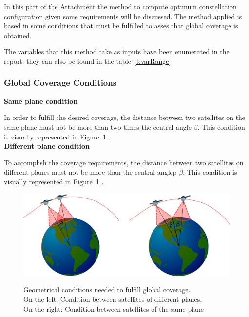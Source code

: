 

In this part of the Attachment the method to compute optimum constellation configuration given some requirements will be discussed. The method applied is based in some conditions that must be fulfilled to asses that global coverage is obtained.

The variables that this method take as inputs have been enumerated in the report. they can also be found in the table~\ref{t:varRange}

\subsubsection{Global Coverage Conditions}


\textbf{Same plane condition}\

In order to fulfill the desired coverage, the distance between two satellites on the same plane must not be more than two times the central angle $\beta$. This condition is visually represented in Figure~\ref{fig:ConditionGCoverage} .\\

\textbf{Different plane condition}\

To accomplish the coverage requirements, the distance between two satellites on different planes must not be more than the central anglep $\beta$. This condition is visually represented in Figure~\ref{fig:ConditionGCoverage} .\\

\begin{figure}[H] %
	\centering
	\includegraphics[width=.8\textwidth]{./testing/ConditionGCoverage.png}\\
	\caption{Geometrical conditions needed to fulfill global coverage.\\
			On the left: Condition between satellites of different planes.\\
			On the right: Condition between satellites of the same plane}
	\label{fig:ConditionGCoverage}
\end{figure}


